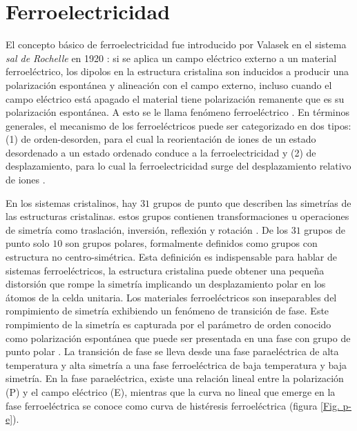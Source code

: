 
\section{Ferroelectricidad}

El concepto básico de ferroelectricidad fue introducido por Valasek en el sistema \textit{sal de Rochelle} en 1920 \cite{Valasek1921Piezo-electricSalt}: si se aplica un campo eléctrico externo a un material ferroeléctrico, los dipolos en la estructura cristalina son inducidos a producir una polarización espontánea y alineación con el campo externo, incluso cuando el campo eléctrico está apagado el material tiene polarización remanente que es su polarización espontánea. A esto se le llama fenómeno ferroeléctrico \cite{Kim2018FerroelectricSplitting}. En términos generales, el mecanismo de los ferroeléctricos puede ser categorizado en dos tipos: (1) de orden-desorden, para el cual la reorientación de iones de un estado desordenado a un estado ordenado conduce a la ferroelectricidad  y (2) de desplazamiento, para lo cual la ferroelectricidad surge del desplazamiento relativo de iones \cite{Kim2018FerroelectricSplitting,Shi2016SymmetryFerroelectrics}. 

En los sistemas cristalinos, hay $31$ grupos de punto que describen las simetrías de las estructuras cristalinas. estos grupos contienen transformaciones u operaciones de simetría como traslación, inversión, reflexión y rotación \cite{Glazer2013SpaceScientists}. De los $31$ grupos de punto solo $10$ son grupos polares, formalmente definidos como grupos con estructura no centro-simétrica. Esta definición es indispensable para hablar de sistemas ferroeléctricos, la estructura cristalina puede obtener una pequeña distorsión que rompe la simetría implicando un desplazamiento polar en los átomos de la celda unitaria. Los materiales ferroeléctricos son inseparables del rompimiento de simetría exhibiendo un fenómeno de transición de fase. Este rompimiento de la simetría es capturada por el parámetro de orden conocido como polarización espontánea que puede ser presentada en una fase con grupo de punto polar \cite{Rabe2007ModernFerro}. La transición de fase se lleva desde una fase paraeléctrica de alta temperatura y alta simetría a una fase ferroeléctrica de baja temperatura y baja simetría. En la fase paraeléctrica, existe una relación lineal entre la polarización (P) y el campo eléctrico (E), mientras que la curva no lineal que emerge en la fase ferroeléctrica se conoce como  curva de histéresis ferroeléctrica \cite{Shi2016SymmetryFerroelectrics} (figura \ref{Fig. p-e}). 

